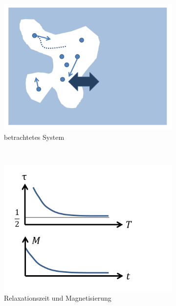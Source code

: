 \documentclass[12pt]{article}
\begin{document}
\begin{figure}[h] 
		\begin{subfigure}[h]{0.5 \textwidth}
		\centering
		\includegraphics[width=\textwidth]{Folie31.png}
		\caption{betrachtetes System} 
		\label{fig:System}
		\centering
	\end{subfigure}
	~
\begin{subfigure}[h]{0.5\textwidth}
		\centering
		\includegraphics[width=\textwidth]{Folie32.png}
		\caption{Relaxationszeit und Magnetisierung}
		\label{fig:Relax}
		\centering
	\end{subfigure}
	\caption{ }
\end{figure}	
\end{document}
